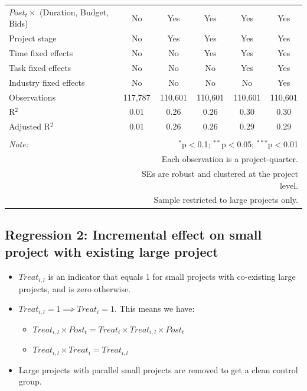 \documentclass[
]{article}
\providecommand{\tightlist}{%
  \setlength{\itemsep}{0pt}\setlength{\parskip}{0pt}}
\begin{document}
\begin{table}[H]
\begin{tabular}{@{\extracolsep{-10pt}}lccccc}
$Post_t \times $  (Duration, Budget, Bids) & No & Yes & Yes & Yes & Yes \\ 
Project stage & No & Yes & Yes & Yes & Yes \\ 
Time fixed effects & No & No & Yes & Yes & Yes \\ 
Task fixed effects & No & No & No & Yes & Yes \\ 
Industry fixed effects & No & No & No & No & Yes \\ 
Observations & 117,787 & 110,601 & 110,601 & 110,601 & 110,601 \\ 
R$^{2}$ & 0.01 & 0.26 & 0.26 & 0.30 & 0.30 \\ 
Adjusted R$^{2}$ & 0.01 & 0.26 & 0.26 & 0.29 & 0.29 \\ 
\hline 
\hline \\[-1.8ex] 
\textit{Note:}  & \multicolumn{5}{r}{$^{*}$p$<$0.1; $^{**}$p$<$0.05; $^{***}$p$<$0.01} \\ 
 & \multicolumn{5}{r}{Each observation is a project-quarter.} \\ 
 & \multicolumn{5}{r}{SEs are robust and clustered at the project level.} \\ 
 & \multicolumn{5}{r}{Sample restricted to large projects only.} \\ 
\end{tabular} 
\end{table}

\hypertarget{regression-2-incremental-effect-on-small-project-with-existing-large-project}{%
\subsection{Regression 2: Incremental effect on small project with
existing large
project}\label{regression-2-incremental-effect-on-small-project-with-existing-large-project}}

\begin{itemize}
\tightlist
\item
  \(Treat_{i,l}\) is an indicator that equals 1 for small projects with
  co-existing large projects, and is zero otherwise.
\item
  \(Treat_{i,l}=1 \implies Treat_i = 1\). This means we have:

  \begin{itemize}
  \tightlist
  \item
    \(Treat_{i,l} \times Post_t = Treat_i \times Treat_{i,l} \times Post_t\)
  \item
    \(Treat_{i,l} \times Treat_i = Treat_{i,l}\)
  \end{itemize}
\item
  Large projects with parallel small projects are removed to get a clean
  control group.
\end{itemize}
\end{document}
